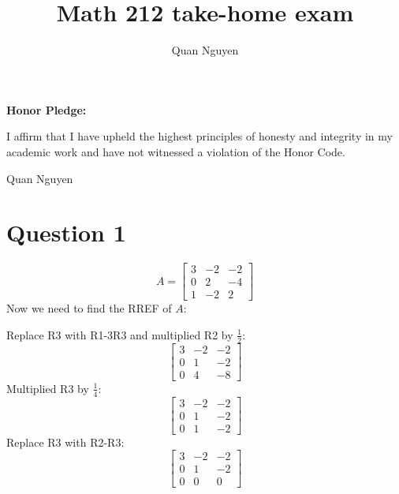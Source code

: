 \documentclass[10pt]{article}
\begin{document}
\title{Math 212 take-home exam}
\author{Quan Nguyen}
\maketitle

\bigskip
\noindent
{\bf Honor Pledge:}
\par
\noindent I affirm that I have upheld the highest principles of honesty and integrity in my academic work and have not witnessed a violation of the Honor Code.
\par
\bigskip
\noindent Quan Nguyen

\bigskip
\noindent

\section*{Question 1}
\begin{equation*}
    A = 
    \begin{bmatrix}
        3 & -2  & -2 \\
        0 & 2 & -4 \\
        1 & -2 & 2 
    \end{bmatrix}
\end{equation*}
\noindent Now we need to find the RREF of $A$: \par
\noindent Replace R3 with R1-3R3 and multiplied R2 by $\frac{1}{2}$:
\begin{equation*}
    \begin{bmatrix}
        3 & -2  & -2 \\
        0 & 1 & -2 \\
        0 & 4 & -8 
    \end{bmatrix}
\end{equation*}
\noindent Multiplied R3 by $\frac{1}{4}$:
\begin{equation*}
    \begin{bmatrix}
        3 & -2  & -2 \\
        0 & 1 & -2 \\
        0 & 1 & -2 
    \end{bmatrix}
\end{equation*}
\noindent Replace R3 with R2-R3:
\begin{equation*}
    \begin{bmatrix}
        3 & -2  & -2 \\
        0 & 1 & -2 \\
        0 & 0 & 0 
    \end{bmatrix}
\end{equation*}
\end{document}
